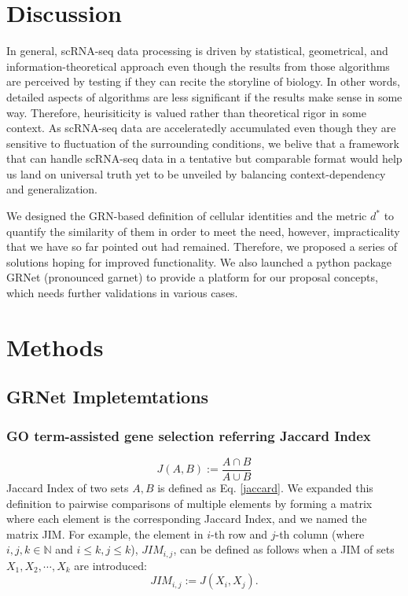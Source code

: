 \documentclass{article}
\begin{document}
\section*{Discussion}
In general, scRNA-seq data processing is driven by statistical, geometrical, and information-theoretical approach 
even though the results from those algorithms are perceived by testing if they can recite the storyline of biology. In 
other words, detailed aspects of algorithms are less significant if the results make sense in some way. Therefore, 
heurisiticity is valued rather than theoretical rigor in some context. As scRNA-seq data are acceleratedly 
accumulated even though they are sensitive to fluctuation of the surrounding conditions, we belive that a framework that 
can handle scRNA-seq data in a tentative but comparable format would help us land on universal truth yet to be 
unveiled by balancing context-dependency and generalization.

We designed the GRN-based definition of cellular identities and the metric $d^*$ to quantify the similarity of them 
in order to meet the need, however, impracticality that we have so far pointed out had remained. Therefore, we 
proposed a series of solutions hoping for improved functionality. We also launched a python package GRNet 
(pronounced garnet) to provide a platform for our proposal concepts, which needs further validations in various cases.

\section*{Methods}
\subsection*{GRNet Impletemtations}

\subsubsection*{GO term-assisted gene selection referring Jaccard Index}
\begin{equation}\label{jaccard}
  J(A, B) := \frac{A\cap B}{A\cup B}
\end{equation}
Jaccard Index of two sets $A, B$ is defined as Eq. \eqref{jaccard}. We expanded this 
definition to pairwise comparisons of multiple elements by forming a matrix 
where each element is the corresponding Jaccard Index, and we named the matrix \ac{JIM}. For example, the element in 
$i$-th row and $j$-th column (where $i, j, k\in\mathbb{N}$ and $i\leq k, j\leq k$), $JIM_{i,j}$, can be defined as
follows when a JIM of sets $X_1, X_2,\cdots, X_k$ are introduced:
\begin{equation}\label{jim}
  JIM_{i, j} := J(X_i, X_j).
\end{equation}
\end{document}
